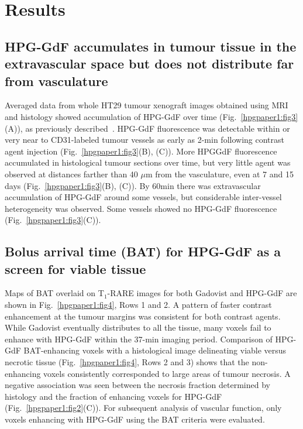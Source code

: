 \section{Results}

\subsection{HPG-GdF accumulates in tumour tissue in the extravascular space but does not distribute far from vasculature}

Averaged data from whole HT29 tumour xenograft images obtained using MRI and histology showed accumulation of \acs{HPG-GdF} over time (Fig.~\ref{hpgpaper1:fig3}(A)), as previously described~\cite{Saatchi:2012hc}.
HPG-GdF fluorescence was detectable within or very near to \acs{CD31}-labeled tumour vessels as early as 2-min following contrast agent injection (Fig.~\ref{hpgpaper1:fig3}(B), (C)).
More HPGGdF fluorescence accumulated in histological tumour sections over time, but very little agent was observed at distances farther than 40 $\mu$m from the vasculature, even at 7 and 15 days (Fig.~\ref{hpgpaper1:fig3}(B), (C)).
By 60min there was extravascular accumulation of \acs{HPG-GdF} around some vessels, but considerable inter-vessel heterogeneity was observed.
Some vessels showed no \acs{HPG-GdF} fluorescence (Fig.~\ref{hpgpaper1:fig3}(C)). 

\subsection{Bolus arrival time (BAT) for \acs{HPG-GdF} as a screen for viable tissue}

Maps of \acs{BAT} overlaid on T$_1$-RARE images for both Gadovist and \acs{HPG-GdF} are shown in Fig.~\ref{hpgpaper1:fig4}, Rows 1 and 2.
A pattern of faster contrast enhancement at the tumour margins was consistent for both contrast agents.
While Gadovist eventually distributes to all the tissue, many voxels fail to enhance with \acs{HPG-GdF} within the 37-min imaging period.
Comparison of \acs{HPG-GdF} \acs{BAT}-enhancing voxels with a histological image delineating viable versus necrotic tissue (Fig.~\ref{hpgpaper1:fig4}, Rows 2 and 3) shows that the non-enhancing voxels consistently corresponded to large areas of tumour necrosis.
A negative association was seen between the necrosis fraction determined by histology and the fraction of enhancing voxels for \acs{HPG-GdF} (Fig.~\ref{hpgpaper1:fig2}(C)).
For subsequent analysis of vascular function, only voxels enhancing with \acs{HPG-GdF} using the \acs{BAT} criteria were evaluated.

